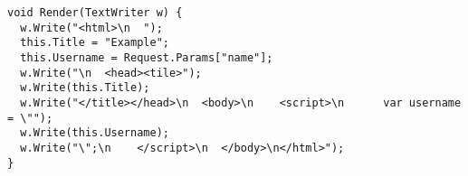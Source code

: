 \begin{lstlisting}[language={[Sharp]C}, caption=The compiled \csh output of Listing~\ref{code:simple-aspx}., label=code:simple-compiled-cs, float]
void Render(TextWriter w) {
  w.Write("<html>\n  ");
  this.Title = "Example";
  this.Username = Request.Params["name"];
  w.Write("\n  <head><tile>");
  w.Write(this.Title);
  w.Write("</title></head>\n  <body>\n    <script>\n      var username = \"");
  w.Write(this.Username);
  w.Write("\";\n    </script>\n  </body>\n</html>");
}
\end{lstlisting}
